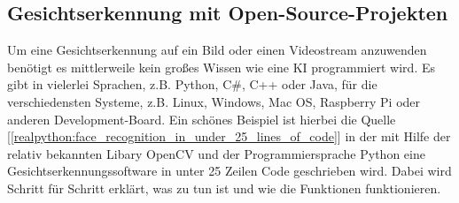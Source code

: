     \subsection{Gesichtserkennung mit Open-Source-Projekten}
        Um eine Gesichtserkennung auf ein Bild oder einen Videostream anzuwenden benötigt es mittlerweile kein großes Wissen wie eine KI programmiert wird. Es gibt in vielerlei Sprachen, z.B. Python, C#, C++ oder Java, für die verschiedensten Systeme, z.B. Linux, Windows, Mac OS, Raspberry Pi oder anderen Development-Board. Ein schönes Beispiel ist hierbei die Quelle [\ref{realpython:face_recognition_in_under_25_lines_of_code}] in der mit Hilfe der relativ bekannten Libary OpenCV und der Programmiersprache Python eine Gesichtserkennungssoftware in unter 25 Zeilen Code geschrieben wird. Dabei wird Schritt für Schritt erklärt, was zu tun ist und wie die Funktionen funktionieren.
